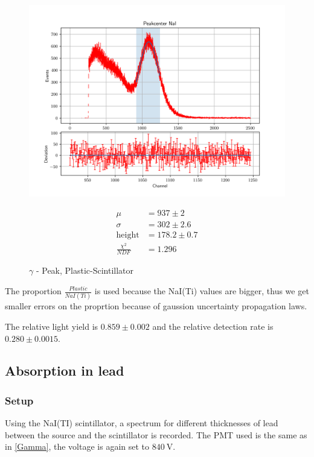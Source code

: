 \documentclass[12pt,twoside,a4paper]{scrartcl}
\begin{document}
			\begin{figure}[H]
				\centering
					\begin{minipage}{0.69 \textwidth}
						\includegraphics[width = \textwidth]{Plots/Scinti/PeakNaIBest.png}
					\end{minipage}
					\begin{minipage}{0.29 \textwidth}
						\begin{align*}
							\mu &= 937 \pm 2 \\
							\sigma &= 302 \pm 2.6 \\
                            \text{height} &= 178.2 \pm 0.7 \\
							\frac{\chi^2}{NDF} &= 1.296
						\end{align*}
					\end{minipage}
                    \caption{$\gamma$ - Peak, Plastic-Scintillator}
				\end{figure}

            The proportion $\frac{Plastic}{NaI(Ti)}$ is used because the NaI(Ti)
            values are bigger, thus we get smaller errors on the proprtion because
            of gaussion uncertainty propagation laws.

            The relative light yield is $0.859 \pm 0.002$ and the relative detection
            rate is $0.280 \pm 0.0015$.
	\subsection{Absorption in lead}
	\label{Absorption::Pb}
		\subsubsection{Setup}
			Using the NaI(TI) scintillator, a spectrum for different thicknesses of lead between the source and the scintillator is recorded. The PMT used is the same as in \ref{Gamma}, the voltage is again set to $\SI{840}{\volt}$.
\end{document}
